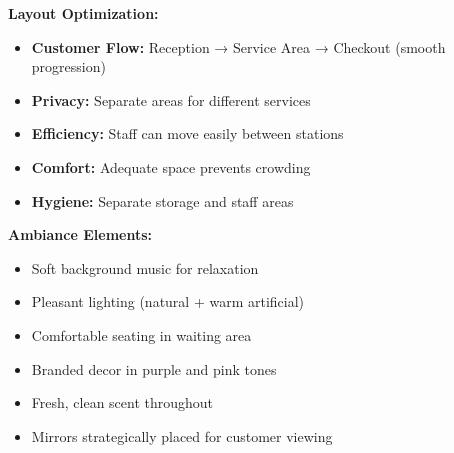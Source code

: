 \begin{tcolorbox}[mybox, title=\textbf{Facility Design Principles}]
\textbf{Layout Optimization:}
\begin{itemize}[leftmargin=1em, itemsep=0pt]
    \item \textbf{Customer Flow:} Reception → Service Area → Checkout (smooth progression)
    \item \textbf{Privacy:} Separate areas for different services
    \item \textbf{Efficiency:} Staff can move easily between stations
    \item \textbf{Comfort:} Adequate space prevents crowding
    \item \textbf{Hygiene:} Separate storage and staff areas
\end{itemize}

\textbf{Ambiance Elements:}
\begin{itemize}[leftmargin=1em, itemsep=0pt]
    \item Soft background music for relaxation
    \item Pleasant lighting (natural + warm artificial)
    \item Comfortable seating in waiting area
    \item Branded decor in purple and pink tones
    \item Fresh, clean scent throughout
    \item Mirrors strategically placed for customer viewing
\end{itemize}
\end{tcolorbox}

